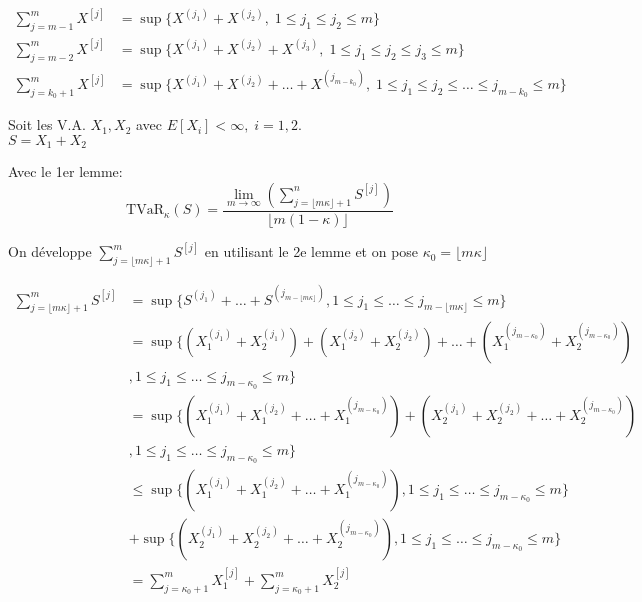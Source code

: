 \documentclass[]{book}
\theoremstyle{definition}
\theoremstyle{definition}
\theoremstyle{definition}
\theoremstyle{remark}
\begin{document}
\begin{align*}
\sum^m_{j=m-1}X^{[j]}& = \sup\{X^{(j_1)}+X^{(j_2)},\; 1\le j_1 \le j_2 \le m\}\\
\sum^m_{j=m-2}X^{[j]}& = \sup\{X^{(j_1)}+X^{(j_2)}+X^{(j_3)},\; 1\le j_1 \le j_2 \le j_3 \le m\}\\
\sum^m_{j=k_0+1}X^{[j]}& = \sup\{X^{(j_1)}+X^{(j_2)}+\dots+X^{(j_{m-k_0})},\; 1\le j_1 \le j_2 \le \dots \le j_{m-k_0} \le m\}
\end{align*}

Soit les V.A. \(X_1,X_2\) avec \(E[X_i]<\infty,\;i=1,2\).\\
\(S=X_1+X_2\)

Avec le 1er lemme:\\
\[\text{TVaR}_{\kappa}(S) =\frac{\lim_{m\to\infty} \left(\sum^n_{j=\lfloor m\kappa\rfloor +1} S^{[j]} \right)}{\lfloor m(1-\kappa)\rfloor}\]

On développe \(\sum^m_{j=\lfloor m\kappa\rfloor +1} S^{[j]}\) en
utilisant le 2e lemme et on pose \(\kappa_0=\lfloor m\kappa \rfloor\)

\begin{align*}
\sum^m_{ j =  \lfloor m \kappa \rfloor +1 } S^{ [j] } & = \sup \{ S^{ (j_1) } + \dots + S^{ ( j_{ m-\lfloor m \kappa \rfloor } ) } ,1 \le j_1 \le \dots \le j_{ m- \lfloor m \kappa \rfloor } \le m \} \\
& = \sup \{ \left( X^{ (j_1) }_1 + X^{ (j_1) }_2 \right) +\left( X^{ (j_2) }_1 + X^{ (j_2) }_2 \right) + \dots + \left( X^{ ( j_{ m - \kappa_0 } ) }_1 + X^{ ( j_{ m-\kappa_0} ) }_2 \right) \\ 
& ,1 \le j_1 \le \dots \le j_{ m-\kappa_0 }\le m \} \\
& = \sup \{ \left( X_1^{ (j_1) } + X_1^{ (j_2) } + \dots + X_1^{ ( j_{ m-\kappa_0 } ) } \right) +\left( X_2^{ (j_1) } + X_2^{ (j_2) } + \dots + X_2^{ ( j_{ m-\kappa_0 } ) } \right) \\
& ,1 \le j_1 \le \dots \le j_{ m-\kappa_0 } \le m \}\\ 
& \le \sup \{ \left( X_1^{ (j_1) } + X_1^{ (j_2) } + \dots + X_1^{ ( j_{ m-\kappa_0 } ) } \right) ,1 \le j_1 \le  \dots \le j_{ m-\kappa_0 } \le m \}\\
& + \sup \{ \left( X_2^{ (j_1) } + X_2^{ (j_2) } + \dots +X_2^{ ( j_{ m-\kappa_0 } ) } \right) ,1 \le j_1 \le \dots \le j_{ m -\kappa_0 } \le m \} \\
& = \sum^m_{ j=\kappa_0 +1 } X_1^{ [j] } + \sum^m_{ j=\kappa_0 +1 } X_2^{ [j] }
\end{align*}
\end{document}
